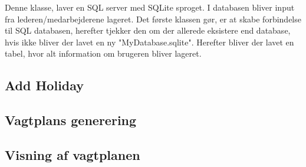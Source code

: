 Denne klasse, laver en SQL server med SQLite sproget. I databasen bliver input fra lederen/medarbejderene lageret. Det første klassen gør, er at skabe forbindelse til SQL databasen, herefter tjekker den om der allerede eksistere end database, hvis ikke bliver der lavet en ny "MyDatabase.sqlite". Herefter bliver der lavet en tabel, hvor alt information om brugeren bliver lageret. 

\subsection{Add Holiday}

\subsection{Vagtplans generering}

\subsection{Visning af vagtplanen}

\subsection{}